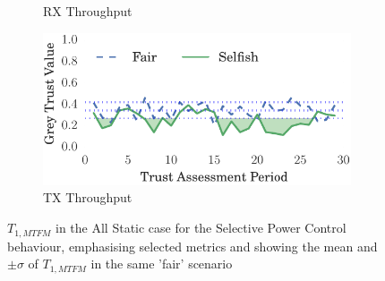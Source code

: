 \documentclass[conference]{IEEEtran}
\begin{document}
\begin{figure}[h]
\begin{subfigure}{0.5\textwidth}
  \caption{RX Throughput}
  \label{fig:static_badmouthing_rxthroughput}
\end{subfigure}
\begin{subfigure}{0.5\textwidth}
\centering
  \includegraphics[width=.95\linewidth]{img/trust_bella_static_emph_TXThroughput_BadMouthingPowerControl.pdf}
  \caption{TX Throughput}
  \label{fig:static_badmouthing_txthroughput}
\end{subfigure}
\caption{$T_{1,MTFM}$ in the All Static case for the Selective Power Control behaviour, emphasising selected metrics and showing the mean and $\pm \sigma$ of $T_{1,MTFM}$ in the same 'fair' scenario}
\label{fig:static_badmouthing}
\end{figure}
%
\end{document}
